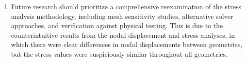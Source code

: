 \documentclass[../main.tex]{subfiles}
\begin{document}
\begin{enumerate}
  \item Future research should prioritize a comprehensive reexamination of the stress analysis methodology, including mesh sensitivity studies, alternative solver approaches, and verification against physical testing. This is due to the counterintuitive results from the nodal displacement and stress analyses, in which there were clear differences in nodal displacements between geometries, but the stress values were suspiciously similar throughout all geometries.

\end{enumerate}
\end{document}
